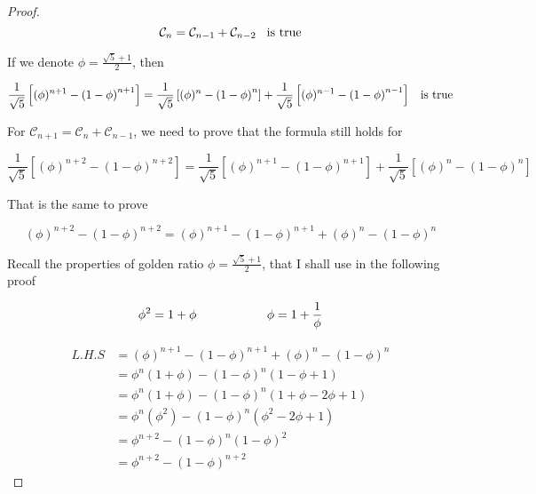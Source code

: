 \documentclass[12pt]{article}
\begin{document}
\begin{proof}
    \[ \mathcal{C}_{n} = \mathcal{C}_{n-1} + \mathcal{C}_{n-2} \hspace*{0.3cm} \text{is true}\]

    \vspace*{0.3cm}
    \hspace*{1.2cm}
    If we denote $ \phi = \frac{\sqrt{5}+1}{2}$, then

    \[ \frac{1}{\sqrt{5}} \left[ (\phi)^{n+1} - \left( 1-\phi \right)^{n+1} \right] = 
    \frac{1}{\sqrt{5}} \left[ (\phi)^{n} - \left( 1-\phi \right)^{n} \right] + 
    \frac{1}{\sqrt{5}} \left[ (\phi)^{n-1} - \left(1 -\phi \right)^{n-1} \right] 
    \hspace*{0.3cm} \text{is true} \] 

    \vspace*{0.3cm}
    \hspace*{1.2cm}
    For $\mathcal{C}_{n+1} = \mathcal{C}_n + \mathcal{C}_{n-1} $, we need to prove that the formula still holds for

    \[ \frac{1}{\sqrt{5}} \left[ (\phi)^{n+2} - \left(1-\phi \right)^{n+2} \right] = 
    \frac{1}{\sqrt{5}} \left[ (\phi)^{n+1} - \left( 1-\phi \right)^{n+1} \right] + 
    \frac{1}{\sqrt{5}} \left[ (\phi)^{n} - \left( 1-\phi \right)^{n} \right] 
     \] 

    \vspace*{0.3cm}
    \hspace*{1.2cm}
    That is the same to prove

    \[   (\phi)^{n+2} - \left(1 -\phi \right)^{n+2}  = 
   (\phi)^{n+1} - \left( 1-\phi \right)^{n+1}  + 
     (\phi)^{n} - \left( 1-\phi \right)^{n}  \]

    \vspace*{0.3cm}
    \hspace*{1.2cm}
    Recall the properties of golden ratio $\phi = \frac{\sqrt{5}+1}{2}$, that I shall use in the following proof

    \[ \phi^2 = 1 + \phi \hspace*{2cm} \phi = 1 + \frac{1}{\phi} \]

    \begin{align*}
        L.H.S & =  (\phi)^{n+1} - \left( 1-\phi \right)^{n+1}  + 
        (\phi)^{n} - \left( 1-\phi \right)^{n} \\
         & = \phi^n \left( 1+\phi \right) - \left( 1-\phi \right)^n(1-\phi+1) \\
        & = \phi^n \left( 1+\phi \right) - \left( 1-\phi \right)^n(1+\phi-2\phi+1) \\
        & = \phi^n \left( \phi^2 \right) - \left( 1-\phi \right)^n(\phi^2-2\phi+1) \\
        & = \phi^{n+2} - \left( 1-\phi \right)^{n}\left(1 - \phi\right)^2 \\
        & = \phi^{n+2} - \left( 1-\phi \right)^{n+2}
    \end{align*}


\end{proof}
\end{document}
